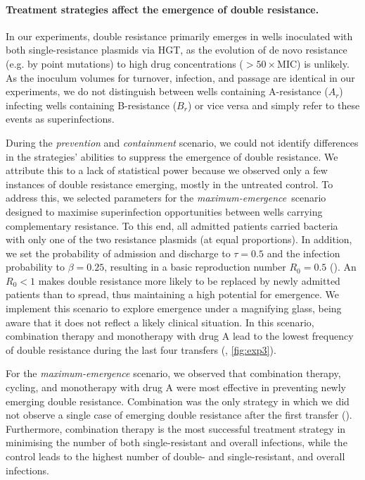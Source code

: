 \paragraph{Treatment strategies affect the emergence of double resistance.}
In our experiments, double resistance primarily emerges in wells inoculated with both single-resistance plasmids via HGT, as the evolution of de novo resistance (e.g. by point mutations) to high drug concentrations ($>50 \times$MIC) is unlikely.
As the inoculum volumes for turnover, infection, and passage are identical in our experiments, we do not distinguish between wells containing A-resistance ($A_r$) infecting wells containing B-resistance ($B_r$) or vice versa and simply refer to these events as superinfections.

During the \textit{prevention} and \textit{containment} scenario, we could not identify differences in the strategies' abilities to suppress the emergence of double resistance.
We attribute this to a lack of statistical power because we observed only a few instances of double resistance emerging, mostly in the untreated control.
To address this, we selected parameters for the \textit{maximum-emergence}~scenario designed to maximise superinfection opportunities between wells carrying complementary resistance.
To this end, all admitted patients carried bacteria with only one of the two resistance plasmids (at equal proportions).
In addition, we set the probability of admission and discharge to $\tau = 0.5$ and the infection probability to $\beta = 0.25$, resulting in a basic reproduction number $R_0 = 0.5$ ().
An $R_0<1$ makes double resistance more likely to be replaced by newly admitted patients than to spread, thus maintaining a high potential for emergence.
We implement this scenario to explore emergence under a magnifying glass, being aware that it does not reflect a likely clinical situation. In this scenario, combination therapy and monotherapy with drug A lead to the lowest frequency of double resistance during the last four transfers (, \autoref{fig:exp3}).

For the \textit{maximum-emergence} scenario, we observed that combination therapy, cycling, and monotherapy with drug A were most effective in preventing newly emerging double resistance.
Combination was the only strategy in which we did not observe a single case of emerging double resistance after the first transfer ().
Furthermore, combination therapy is the most successful treatment strategy in minimising the number of both single-resistant and overall infections, while the control leads to the highest number of double- and single-resistant, and overall infections.

